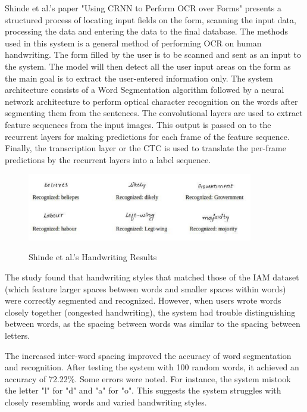 Shinde et al.'s paper "Using CRNN to Perform OCR over Forms"  presents a structured process of locating input fields on the form, scanning the input data, processing the data and entering the data to the final database. The methods used in this system is a general method of performing OCR on human handwriting. The form filled by the user is to be scanned and sent as an input to the system. The model will then detect all the user input areas on the form as the main goal is to extract the user-entered information only. The system architecture consists of a Word Segmentation algorithm followed by a neural network architecture to perform optical character recognition on the words after segmenting them from the sentences. The convolutional layers are used to extract feature sequences from the input images. This output is passed on to the recurrent layers for making predictions for each frame of the feature sequence. Finally, the transcription layer or the CTC is used to translate the per-frame predictions by the recurrent layers into a label sequence.

\begin{figure}[ht]
    \centering
    \includegraphics[width=0.88\textwidth]{Figures/CRNN_Papers/Shinde_2020.jpg}
    \caption[Shinde et al.'s Handwriting Results]{Shinde et al.'s Handwriting Results}\cite{shindeUsingCRNNPerform2021}
    \label{fig:Shinde et al.'s Handwriting Results}
\end{figure}

The study found that handwriting styles that matched those of the IAM dataset (which feature larger spaces between words and smaller spaces within words) were correctly segmented and recognized. However, when users wrote words closely together (congested handwriting), the system had trouble distinguishing between words, as the spacing between words was similar to the spacing between letters.

The increased inter-word spacing improved the accuracy of word segmentation and recognition. After testing the system with 100 random words, it achieved an accuracy of 72.22\%. Some errors were noted. For instance, the system mistook the letter "l" for "d" and "a" for "o". This suggests the system struggles with closely resembling words and varied handwriting styles.

